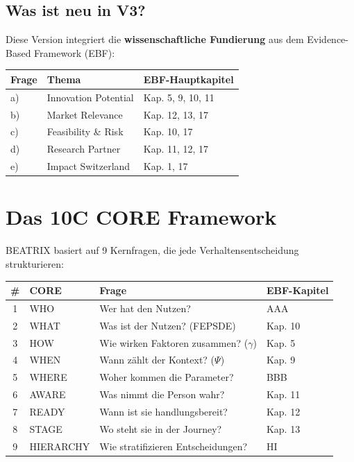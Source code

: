 \documentclass[11pt,a4paper]{article}
\begin{document}
\subsection*{Was ist neu in V3?}

Diese Version integriert die \textbf{wissenschaftliche Fundierung} aus dem Evidence-Based Framework (EBF):

\begin{center}
\begin{tabular}{lll}
\toprule
\textbf{Frage} & \textbf{Thema} & \textbf{EBF-Hauptkapitel} \\
\midrule
a) & Innovation Potential & Kap. 5, 9, 10, 11 \\
b) & Market Relevance & Kap. 12, 13, 17 \\
c) & Feasibility \& Risk & Kap. 10, 17 \\
d) & Research Partner & Kap. 11, 12, 17 \\
e) & Impact Switzerland & Kap. 1, 17 \\
\bottomrule
\end{tabular}
\end{center}

\newpage


\section*{Das 10C CORE Framework}

\begin{corebox}
BEATRIX basiert auf 9 Kernfragen, die jede Verhaltensentscheidung strukturieren:

\begin{center}
\begin{tabular}{clll}
\toprule
\textbf{\#} & \textbf{CORE} & \textbf{Frage} & \textbf{EBF-Kapitel} \\
\midrule
1 & WHO & Wer hat den Nutzen? & AAA \\
2 & WHAT & Was ist der Nutzen? (FEPSDE) & Kap. 10 \\
3 & HOW & Wie wirken Faktoren zusammen? ($\gamma$) & Kap. 5 \\
4 & WHEN & Wann zählt der Kontext? ($\Psi$) & Kap. 9 \\
5 & WHERE & Woher kommen die Parameter? & BBB \\
6 & AWARE & Was nimmt die Person wahr? & Kap. 11 \\
7 & READY & Wann ist sie handlungsbereit? & Kap. 12 \\
8 & STAGE & Wo steht sie in der Journey? & Kap. 13 \\
9 & HIERARCHY & Wie stratifizieren Entscheidungen? & HI \\
\bottomrule
\end{tabular}
\end{center}
\end{corebox}
\end{document}
